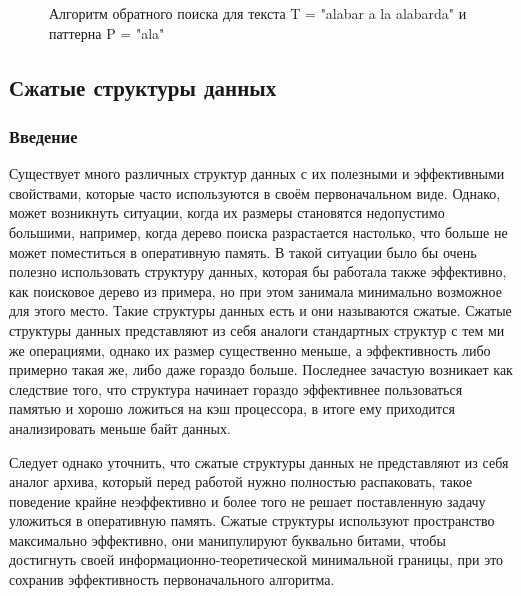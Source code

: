 \documentclass[a4paper,12pt]{article}
\begin{document}
\begin{figure}[h!]
\caption{Алгоритм обратного поиска для текста T = "alabar a la alabarda" и паттерна P = "ala"}
\end{figure}

\subsection{Сжатые структуры данных}
\subsubsection{Введение}
Существует много различных структур данных с их полезными и эффективными свойствами, которые часто используются в своём первоначальном виде. Однако, может возникнуть ситуации, когда их размеры становятся недопустимо большими, например, когда дерево поиска разрастается настолько, что больше не может поместиться в оперативную память. В такой ситуации было бы очень полезно использовать структуру данных, которая бы работала также эффективно, как поисковое дерево из примера, но при этом занимала минимально возможное для этого место. Такие структуры данных есть и они называются сжатые. Сжатые структуры данных представляют из себя аналоги стандартных структур с тем ми же операциями, однако их размер существенно меньше, а эффективность либо примерно такая же, либо даже гораздо больше. Последнее зачастую возникает как следствие того, что структура начинает гораздо эффективнее пользоваться памятью и хорошо ложиться на кэш процессора, в итоге ему приходится анализировать меньше байт данных.

Следует однако уточнить, что сжатые структуры данных не представляют из себя аналог архива, который перед работой нужно полностью распаковать, такое поведение крайне неэффективно и более того не решает поставленную задачу уложиться в оперативную память. Сжатые структуры используют пространство максимально эффективно, они манипулируют буквально битами, чтобы достигнуть своей информационно-теоретической минимальной границы, при это сохранив эффективность первоначального алгоритма.
\end{document}

